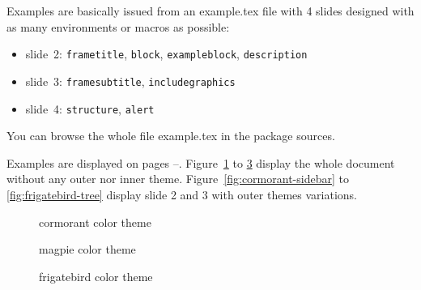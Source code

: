 \documentclass[12pt]{article}
\begin{document}
Examples are basically issued from an \ttfamily{}example.tex\rmfamily{} file with 4 slides designed with as many  environments or macros as possible: 
\begin{itemize}
   \item slide 2: \verb+frametitle+, \verb+block+, \verb+exampleblock+, \verb+description+
   \item slide 3: \verb+framesubtitle+, \verb+includegraphics+ 
   \item slide 4: \verb+structure+, \verb+alert+
\end{itemize}
You can browse the whole file \ttfamily{}example.tex\rmfamily{} in the package sources.

Examples are displayed on pages \pageref{fig:cormorant-default}–\pageref{fig:frigatebird-tree}. Figure~\ref{fig:cormorant-default} to \ref{fig:frigatebird-default} display the whole document without any outer nor inner theme. Figure~\ref{fig:cormorant-sidebar} to \ref{fig:frigatebird-tree} display slide 2 and 3 with outer themes variations.  

\begin{figure}[p]

   \caption{cormorant color theme}
   \label{fig:cormorant-default}
\end{figure}

\begin{figure}[p]

   \caption{magpie color theme}
   \label{fig:magpie-default}
\end{figure}

\begin{figure}[p]

   \caption{frigatebird color theme}
   \label{fig:frigatebird-default}
\end{figure}
\end{document}
